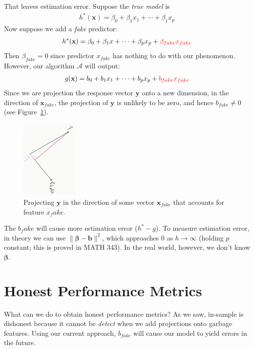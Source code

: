 \documentclass[12pt, a4paper]{article}
\theoremstyle{definition}
\begin{document}
	That leaves estimation error. Suppose the \textit{true model} is
	\begin{align*}
		h^*(\mathbf{x}) = \beta_0 + \beta_1 x_1 + \cdots + \beta_1 x_p
	\end{align*}
	Now suppose we add a \textit{fake} predictor:
	\begin{align*}
		h^*(\mathbf{x})
		= \beta_0 + \beta_1 x + \cdots + \beta_p x_p + {\color{red} \beta_{fake} x_{fake}}
	\end{align*}
	Then $\beta_{fake}=0$ since predictor $x_{fake}$ has nothing to do with
	our phenomenon. However, our algorithm $\mathcal{A}$ will output:
	\begin{align*}
		g(\mathbf{x}) = b_0 + b_1 x_1 + \cdots + b_p x_p + {\color{red}  b_{fake} x_{fake}}
	\end{align*}
	Since we are projection the response vector $\mathbf{y}$ onto a new dimension,
	in the direction of $\mathbf{x}_{fake}$, the projection of $\mathbf{y}$ is unlikely to
	be zero, and hence $b_{fake}\neq 0$ (see Figure~\ref{fig:project-xfake}).
	\begin{figure}
		\centering
		\includegraphics[width=0.25\textwidth]{project-onto-fake-feature}
		\caption{Projecting $\mathbf{y}$ in the direction of some vector $\mathbf{x}_{fake}$
		that accounts for feature $x_fake$.}
		\label{fig:project-xfake}
	\end{figure}
	The $b_fake$ will cause more estimation error ($h^*-g$). To measure estimation error,
	in theory we can use $\|\bm{\beta}-\mathbf{b}\|^2$, which approaches $0$ as
	$h\to\infty$ (holding $p$ constant; this is proved in MATH 343). In the real
	world, however, we don't know $\bm{\beta}$.
	\section*{Honest Performance Metrics}
	What can we do to obtain honest performance metrics? As we saw, in-sample is dishonest
	because it cannot be \textit{detect} when we add projections onto garbage features.
	Using our current approach, $b_{fake}$ will cause our model to yield errors in the future.
	
\end{document}

